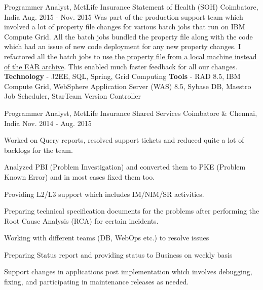\begin{cventries}
  \cventry
    {Programmer Analyst, MetLife Insurance} %
    {Statement of Health (SOH)} %
    {Coimbatore, India} %
    {Aug. 2015 - Nov. 2015} %
    {
        Was part of the production support team which involved a lot of property file changes for various batch jobs that run on IBM Compute Grid. All the batch jobs bundled the property file along with the code which had an issue of new code deployment for any new property changes. I refactored all the batch jobs to \underline{use the property file from a local machine instead of the EAR archive}. This enabled much faster feedback for all our changes.
        \newline
        \textbf{Technology} - J2EE, SQL, Spring, Grid Computing \newline
        \textbf{Tools} - RAD 8.5, IBM Compute Grid, WebSphere Application Server (WAS) 8.5, Sybase DB, Maestro Job Scheduler, StarTeam Version Controller
    }

  \cventry
    {Programmer Analyst, MetLife Insurance} %
    {Shared Services} %
    {Coimbatore \& Chennai, India} %
    {Nov. 2014 - Aug. 2015} %
    {
      \begin{cvitems}
        \item{Worked on Query reports, resolved support tickets and reduced quite a lot of backlogs for the team.}
        \item{Analyzed PBI (Problem Investigation) and converted them to PKE (Problem Known Error) and in most cases fixed them too.}
        \item{Providing L2/L3 support which includes IM/NIM/SR activities.}
        \item{Preparing technical specification documents for the problems after performing the Root Cause Analysis (RCA) for certain incidents.}
        \item{Working with different teams (DB, WebOps etc.) to resolve issues}
        \item{Preparing Status report and providing status to Business on weekly basis}
        \item{Support changes in applications post implementation which involves debugging, fixing, and participating in maintenance releases as needed.}
      \end{cvitems}
    }

\end{cventries}
